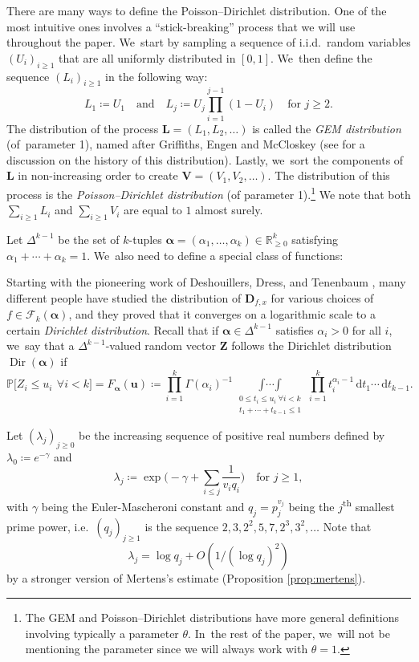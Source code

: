 \documentclass[10pt,a4paper]{article}
\providecommand{\ie}{i.e.\ }
\newcommand{\bu}{{\boldsymbol u}}
\newcommand{\bD}{{\boldsymbol D}}
\newcommand{\bL}{{\boldsymbol L}}
\newcommand{\bV}{{\boldsymbol V}}
\newcommand{\bZ}{{\boldsymbol Z}}
\newcommand{\RR}{\mathbb{R}}
\newcommand{\PP}{\mathbb{P}}
\newcommand{\boldalpha}{\boldsymbol{\alpha}}
\newcommand{\dee}{\,\mathrm{d}}
\newcommand{\simplex}{\Delta^{k-1}}
\newcommand{\bg}{\big}
\newcommand{\bgg}{\Big}
\DeclareMathOperator{\Dir}{Dir}
\theoremstyle{plain}
\theoremstyle{definition}
\begin{document}
There are many ways to define the Poisson--Dirichlet distribution. One of the most intuitive ones involves a ``stick-breaking'' process that we will use throughout the paper. We~start by sampling a sequence of i.i.d.~random variables $(U_i)_{i \ge 1}$ that are all uniformly distributed in $[0, 1]$. We~then define the sequence $(L_i)_{i \ge 1}$ in the following way:
\[
L_1 \coloneqq U_1 \quad \text{and}\quad L_j \coloneqq U_j \prod_{i=1}^{j-1} (1-U_i) \quad \text{for $j \ge 2$.}
\]
The distribution of the process $\bL = (L_1, L_2, \ldots)$ is called the \textit{GEM distribution} (of~parameter 1), named after Griffiths, Engen and McCloskey (see \cite[Ch.\,41]{JKB} for a discussion on the history of this distribution). Lastly, we~sort the components of $\bL$ in non-increasing order to create $\bV = (V_1, V_2, \ldots)$. The distribution of this process is the \textit{Poisson--Dirichlet distribution} (of parameter 1).\footnote{The GEM and Poisson--Dirichlet distributions have more general definitions involving typically a parameter $\theta$. In~the rest of the paper, we~will not be mentioning the parameter since we will always work with $\theta = 1$.} We note that both $\sum_{i \ge 1} L_i$ and $\sum_{i \ge 1} V_i$ are equal to $1$ almost surely.

Let $\simplex$ be the set of $k$-tuples $\boldalpha=(\alpha_1, \ldots, \alpha_k) \in \RR^k_{\ge 0}$ satisfying $\alpha_1+\cdots+\alpha_k=1$. We~also need to define a special class of functions:

Starting with the pioneering work of Deshouillers, Dress, and Tenenbaum \cite{DDT79}, many different people have studied the distribution of $\bD_{f, x}$ for various choices of $f \in \mathcal F_k(\boldalpha)$, and they proved that it converges on a logarithmic scale to a certain {\it Dirichlet distribution}. Recall that if $\boldalpha \in \simplex$ satisfies $\alpha_i > 0$ for all $i$, we~say that a $\simplex$-valued random vector $\bZ$ follows the Dirichlet distribution $\Dir(\boldalpha)$ if
\[
\PP\bg[Z_i \le u_i\ \, \forall i<k\bg] = F_{\boldalpha}(\bu) \coloneqq \prod_{i=1}^{k} \Gamma(\alpha_i)^{-1} \mathop{\int\cdots\int}\limits_{\substack{0 \le t_i \le u_i \ \forall i < k \\ t_1 + \cdots + t_{k-1} \le 1}} \prod_{i=1}^k t_i^{\alpha_i - 1} \dee t_1\cdots \dee t_{k-1}.
\]

Let $(\lambda_j)_{j \ge 0}$ be the increasing sequence of positive real numbers defined by $\lambda_0 \coloneqq e^{-\gamma}$ and
\[
\lambda_j \coloneqq \exp\!\bgg(\!-\gamma+ \sum_{i \le j} \frac{1}{v_iq_i}\bgg)\quad \text{for $j \ge 1$},
\]
with $\gamma$ being the Euler-Mascheroni constant and $q_j = p_j^{v_j}$ being the $j$\textsuperscript{th} smallest prime power, \ie $(q_j)_{j \ge 1}$ is the sequence $2, 3, 2^2, 5, 7, 2^3, 3^2,\dots$ Note that
\begin{equation}
\label{eq:lambda_j}
\lambda_j = \log q_j +O(1/(\log q_j)^2)
\end{equation}
by a stronger version of Mertens's estimate (Proposition \ref{prop:mertens}).
\end{document}
